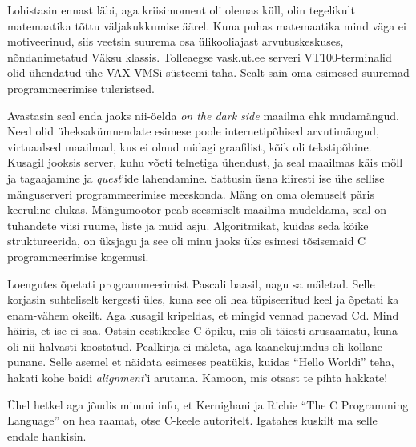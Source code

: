Lohistasin ennast läbi, aga kriisimoment oli olemas 
küll, olin tegelikult matemaatika tõttu väljakukkumise äärel. Kuna puhas matemaatika mind väga ei motiveerinud, siis veetsin suurema osa 
ülikooliajast 
arvutuskeskuses, 
nõndanimetatud Väksu klassis\label{sisu:vase_klass}. Tolleaegse 
vask.ut.ee serveri VT100-terminalid olid ühendatud ühe 
VAX VMSi süsteemi taha. Sealt sain oma esimesed suuremad 
programmeerimise tuleristsed. 

Avastasin seal enda jaoks 
nii-öelda \emph{on the dark side} maailma ehk
mudamängud. Need olid üheksakümnendate 
esimese poole internetipõhised arvutimängud, virtuaalsed maailmad, kus ei olnud 
midagi graafilist, kõik oli tekstipõhine. Kusagil jooksis server, 
kuhu võeti telnetiga ühendust, ja seal maailmas käis möll ja 
tagaajamine ja \emph{quest}'ide lahendamine. Sattusin üsna kiiresti ise ühe sellise mänguserveri 
programmeerimise meeskonda. Mäng on oma 
olemuselt päris keeruline elukas. Mängumootor peab 
seesmiselt maailma mudeldama, seal on tuhandete viisi 
ruume, liste ja muid asju. Algoritmikat, kuidas seda kõike 
struktureerida, on üksjagu ja see oli minu jaoks üks esimesi tõsisemaid 
C programmeerimise kogemusi. 


Loengutes õpetati programmeerimist Pascali baasil, 
nagu sa mäletad. Selle korjasin suhteliselt kergesti üles, kuna see oli 
hea tüpiseeritud keel ja õpetati ka enam-vähem okeilt. Aga kusagil kripeldas, et mingid vennad panevad Cd. Mind
häiris, et ise ei saa. Ostsin eestikeelse C-õpiku, mis oli 
täiesti arusaamatu, kuna oli nii halvasti koostatud. Pealkirja ei mäleta, aga kaanekujundus oli kollane-punane. Selle asemel et näidata esimeses peatükis, kuidas \enquote{Hello 
Worldi} teha, hakati kohe baidi \emph{alignment}'i 
arutama. Kamoon, mis otsast te pihta hakkate! 

Ühel hetkel aga 
jõudis minuni info, et Kernighani ja Richie \enquote{The C Programming 
Language} on hea raamat, otse C-keele autoritelt. 
Igatahes kuskilt ma selle endale hankisin. 


